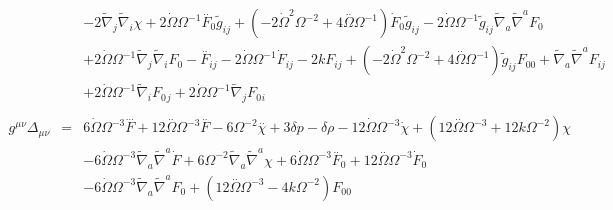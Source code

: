 \documentclass[10pt,letterpaper]{article}
\numberwithin{equation}{section}
\begin{document}
\begin{eqnarray}
&& - 2 \tilde{\nabla}_{j}\tilde{\nabla}_{i}\chi +2 \dot{\Omega} \Omega^{-1} \overset{..}{F}_{0}{} \tilde{g}_{ij} + (-2 \dot{\Omega}^2 \Omega^{-2} + 4 \overset{..}{\Omega} \Omega^{-1}) \dot{F}_{0}{} \tilde{g}_{ij} - 2 \dot{\Omega} \Omega^{-1} \tilde{g}_{ij} \tilde{\nabla}_{a}\tilde{\nabla}^{a}F_{0}{} \nonumber \\ 
&& + 2 \dot{\Omega} \Omega^{-1} \tilde{\nabla}_{j}\tilde{\nabla}_{i}F_{0}{}- \overset{..}{F}_{ij} - 2 \dot{\Omega} \Omega^{-1} \dot{F}_{ij} - 2 k F_{ij} + (-2 \dot{\Omega}^2 \Omega^{-2} + 4 \overset{..}{\Omega} \Omega^{-1}) \tilde{g}_{ij} F_{00}{} + \tilde{\nabla}_{a}\tilde{\nabla}^{a}F_{ij} \nonumber \\ 
&& + 2 \dot{\Omega} \Omega^{-1} \tilde{\nabla}_{i}F_{0}{}_{j} + 2 \dot{\Omega} \Omega^{-1} \tilde{\nabla}_{j}F_{0}{}_{i}
\\  \nonumber\\ 
g^{\mu\nu}\Delta_{\mu\nu}&=& 6 \dot{\Omega} \Omega^{-3} \overset{...}{F} + 12 \overset{..}{\Omega} \Omega^{-3} \overset{..}{F} - 6 \Omega^{-2} \overset{..}{\chi} + 3 \delta p -  \delta \rho - 12 \dot{\Omega} \Omega^{-3} \dot{\chi} + (12 \overset{..}{\Omega} \Omega^{-3} + 12 k \Omega^{-2}) \chi \nonumber \\ 
&& - 6 \dot{\Omega} \Omega^{-3} \tilde{\nabla}_{a}\tilde{\nabla}^{a}\dot{F} + 6 \Omega^{-2} \tilde{\nabla}_{a}\tilde{\nabla}^{a}\chi +6 \dot{\Omega} \Omega^{-3} \overset{..}{F}_{0}{} + 12 \overset{..}{\Omega} \Omega^{-3} \dot{F}_{0}{} \nonumber \\ 
&& - 6 \dot{\Omega} \Omega^{-3} \tilde{\nabla}_{a}\tilde{\nabla}^{a}F_{0}{}+(12 \overset{..}{\Omega} \Omega^{-3} - 4 k \Omega^{-2}) F_{00}{}
\end{eqnarray}
%
%
\end{document}
